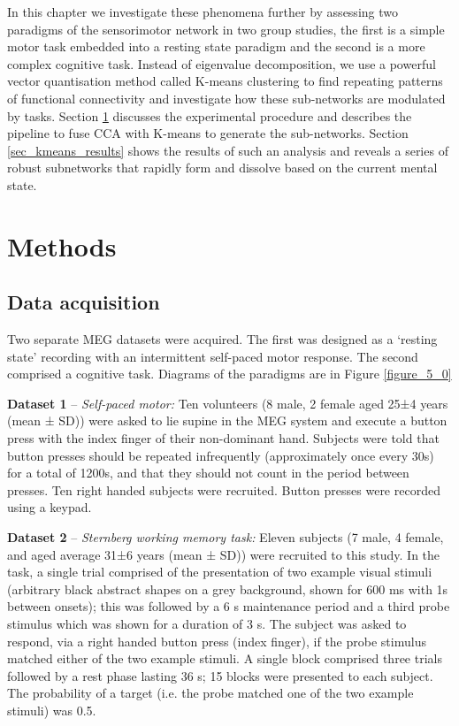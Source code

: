 In this chapter we investigate these phenomena further by assessing two paradigms of the sensorimotor network in two group studies, the first is a simple motor task embedded into a resting state paradigm and the second is a more complex cognitive task. Instead of eigenvalue decomposition, we use a powerful vector quantisation method called K-means clustering \citep{MacQueen1967} to find repeating patterns of functional connectivity and investigate how these sub-networks are modulated by tasks. Section \ref{sec_kmeans_methods} discusses the experimental procedure and describes the pipeline to fuse CCA with K-means to generate the sub-networks. Section \ref{sec_kmeans_results} shows the results of such an analysis and reveals a series of robust subnetworks that rapidly form and dissolve based on the current mental state.

\section{Methods}\label{sec_kmeans_methods}
\subsection{Data acquisition}

Two separate MEG datasets were acquired. The first was designed as a ‘resting state’ recording with an intermittent self-paced motor response. The second comprised a cognitive task. Diagrams of the paradigms are in Figure \ref{figure_5_0}

\textbf{Dataset 1} -- \textit{Self-paced motor:} Ten volunteers (8 male, 2 female aged 25±4 years (mean ± SD)) were asked to lie supine in the MEG system and execute a button press with the index finger of their non-dominant hand. Subjects were told that button presses should be repeated infrequently (approximately once every 30s) for a total of 1200s, and that they should not count in the period between presses. Ten right handed subjects were recruited. Button presses were recorded using a keypad.

\textbf{Dataset 2} -- \textit{Sternberg working memory task:} Eleven subjects (7 male, 4 female, and aged average 31±6 years (mean ± SD)) were recruited to this study. In the task, a single trial comprised of the presentation of two example visual stimuli (arbitrary black abstract shapes on a grey background, shown for 600 ms with 1s between onsets); this was followed by a 6 s maintenance period and a third probe stimulus which was shown for a duration of 3 s. The subject was asked to respond, via a right handed button press (index finger), if the probe stimulus matched either of the two example stimuli. A single block comprised three trials followed by a rest phase lasting 36 s; 15 blocks were presented to each subject. The probability of a target (i.e. the probe matched one of the two example stimuli) was 0.5.

